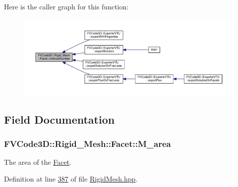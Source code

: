 Here is the caller graph for this function\+:
\nopagebreak
\begin{figure}[H]
\begin{center}
\leavevmode
\includegraphics[width=350pt]{classFVCode3D_1_1Rigid__Mesh_1_1Facet_a5d18db39a0eeb85e6a4afc2b09813201_icgraph}
\end{center}
\end{figure}




\subsection{Field Documentation}
\subsubsection[{\texorpdfstring{M\+\_\+area}{M_area}}]{ F\+V\+Code3\+D\+::\+Rigid\+\_\+\+Mesh\+::\+Facet\+::\+M\+\_\+area\hspace{0.3cm}{\ttfamily [protected]}}\hypertarget{classFVCode3D_1_1Rigid__Mesh_1_1Facet_a084cfcf931748437c2d551a43fdbd47d}{}\label{classFVCode3D_1_1Rigid__Mesh_1_1Facet_a084cfcf931748437c2d551a43fdbd47d}


The area of the \hyperlink{classFVCode3D_1_1Rigid__Mesh_1_1Facet}{Facet}. 



Definition at line \hyperlink{RigidMesh_8hpp_source_l00387}{387} of file \hyperlink{RigidMesh_8hpp_source}{Rigid\+Mesh.\+hpp}.

